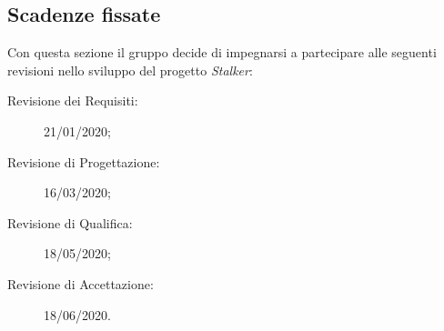 \documentclass[../piano-di-progetto.tex]{subfiles}
\begin{document}
\subsection{Scadenze fissate}%
\label{sub:scadenze_fissate}
Con questa sezione il gruppo decide di impegnarsi a partecipare alle seguenti revisioni nello sviluppo del progetto \textit{Stalker}:
  \begin{description}
    \item[Revisione dei Requisiti:] 21/01/2020;
    \item[Revisione di Progettazione:] 16/03/2020;
    \item[Revisione di Qualifica:] 18/05/2020;
    \item[Revisione di Accettazione:] 18/06/2020.
  \end{description}
\end{document}
